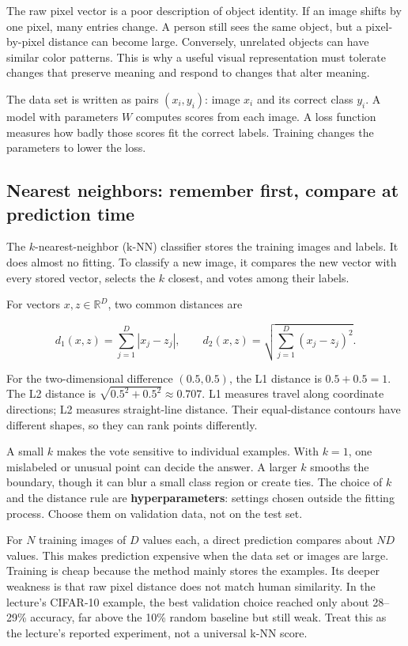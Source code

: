 The raw pixel vector is a poor description of object identity. If an image shifts by one pixel, many entries change. A person still sees the same object, but a pixel-by-pixel distance can become large. Conversely, unrelated objects can have similar color patterns. This is why a useful visual representation must tolerate changes that preserve meaning and respond to changes that alter meaning.

The data set is written as pairs \((x_i,y_i)\): image \(x_i\) and its correct class \(y_i\). A model with parameters \(W\) computes scores from each image. A loss function measures how badly those scores fit the correct labels. Training changes the parameters to lower the loss.

\subsection{Nearest neighbors: remember first, compare at prediction time}\label{04-visual-computing-ii-ch031-nearest-neighbors-remember-first-compare-at-prediction-time}

\hypertarget{04-visual-computing-ii-ch031-nearest-neighbors-remember-first-compare-at-prediction-time}{}

The \(k\)-nearest-neighbor (k-NN) classifier stores the training images and labels. It does almost no fitting. To classify a new image, it compares the new vector with every stored vector, selects the \(k\) closest, and votes among their labels.

For vectors \(x,z\in\mathbb{R}^D\), two common distances are

\[d_1(x,z)=\sum_{j=1}^{D}|x_j-z_j|, \qquad d_2(x,z)=\sqrt{\sum_{j=1}^{D}(x_j-z_j)^2}.\]

For the two-dimensional difference \((0.5,0.5)\), the L1 distance is \(0.5+0.5=1\). The L2 distance is \(\sqrt{0.5^2+0.5^2}\approx0.707\). L1 measures travel along coordinate directions; L2 measures straight-line distance. Their equal-distance contours have different shapes, so they can rank points differently.

A small \(k\) makes the vote sensitive to individual examples. With \(k=1\), one mislabeled or unusual point can decide the answer. A larger \(k\) smooths the boundary, though it can blur a small class region or create ties. The choice of \(k\) and the distance rule are \textbf{hyperparameters}: settings chosen outside the fitting process. Choose them on validation data, not on the test set.

For \(N\) training images of \(D\) values each, a direct prediction compares about \(ND\) values. This makes prediction expensive when the data set or images are large. Training is cheap because the method mainly stores the examples. Its deeper weakness is that raw pixel distance does not match human similarity. In the lecture's CIFAR-10 example, the best validation choice reached only about 28--29\% accuracy, far above the 10\% random baseline but still weak. Treat this as the lecture's reported experiment, not a universal k-NN score.

